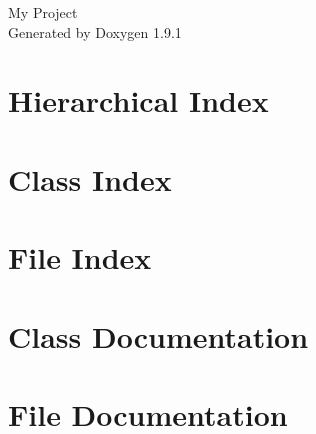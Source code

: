 \let\mypdfximage\pdfximage\def\pdfximage{\immediate\mypdfximage}\documentclass[twoside]{book}
\newcommand{\+}{\discretionary{\mbox{\scriptsize$\hookleftarrow$}}{}{}}
\newcommand{\clearemptydoublepage}{%
  \newpage{\pagestyle{empty}\cleardoublepage}%
}
\begin{document}
\raggedbottom

\hypersetup{pageanchor=false,
             bookmarksnumbered=true,
             pdfencoding=unicode
            }
\begin{titlepage}
\vspace*{7cm}
\begin{center}%
{\Large My Project }\\
\vspace*{1cm}
{\large Generated by Doxygen 1.9.1}\\
\end{center}
\end{titlepage}
\clearemptydoublepage
{}
\tableofcontents
\clearemptydoublepage
{}
\hypersetup{pageanchor=true}

\chapter{Hierarchical Index}

\chapter{Class Index}

\chapter{File Index}

\chapter{Class Documentation}





\chapter{File Documentation}














\backmatter
\newpage
{}
\clearemptydoublepage
{}
\printindex
\end{document}
